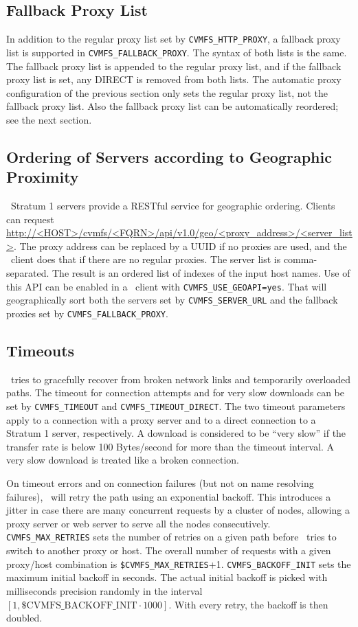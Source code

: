 \subsection{Fallback Proxy List}
In addition to the regular proxy list set by \texttt{CVMFS\_HTTP\_PROXY},
a fallback proxy list is supported in \texttt{CVMFS\_FALLBACK\_PROXY}.
The syntax of both lists is the same.  The fallback proxy list is
appended to the regular proxy list, and if the fallback proxy list
is set, any DIRECT is removed from both lists.  The automatic proxy
configuration of the previous section only sets the regular proxy list,
not the fallback proxy list.  Also the fallback proxy list can be
automatically reordered; see the next section.

\subsection{Ordering of Servers according to Geographic Proximity}
\label{sct:geoapi}
\cvmfs\ Stratum 1 servers provide a RESTful service for geographic ordering.
Clients can request \url{http://<HOST>/cvmfs/<FQRN>/api/v1.0/geo/<proxy_address>/<server_list>}.
The proxy address can be replaced by a UUID if no proxies are used, and the \cvmfs\ client does that if there are no regular proxies.
The server list is comma-separated.
The result is an ordered list of indexes of the input host names.
Use of this API can be enabled in a \cvmfs\ client with \texttt{CVMFS\_USE\_GEOAPI=yes}.
That will geographically sort both the servers set by \texttt{CVMFS\_SERVER\_URL} and the fallback proxies set by \texttt{CVMFS\_FALLBACK\_PROXY}.

\subsection{Timeouts}
\cvmfs\ tries to gracefully recover from broken network links and temporarily overloaded paths.
The timeout for connection attempts and for very slow downloads can be set by \texttt{CVMFS\_TIMEOUT} and \texttt{CVMFS\_TIMEOUT\_DIRECT}.
The two timeout parameters apply to a connection with a proxy server and to a direct connection to a Stratum 1 server, respectively.
A download is considered to be ``very slow'' if the transfer rate is below 100 Bytes/second for more than the timeout interval.
A very slow download is treated like a broken connection.

On timeout errors and on connection failures (but not on name resolving failures), \cvmfs\ will retry the path using an exponential backoff.
This introduces a jitter in case there are many concurrent requests by a cluster of nodes, allowing a proxy server or web server to serve all the nodes consecutively.
\texttt{CVMFS\_MAX\_RETRIES} sets the number of retries on a given path before \cvmfs\ tries to switch to another proxy or host. 
The overall number of requests with a given proxy/host combination is \texttt{\$CVMFS\_MAX\_RETRIES}+1.
\texttt{CVMFS\_BACKOFF\_INIT} sets the maximum initial backoff in seconds.  
The actual initial backoff is picked with milliseconds precision randomly in the interval $[1, \text{\$CVMFS\_BACKOFF\_INIT}\cdot 1000]$.
With every retry, the backoff is then doubled.

